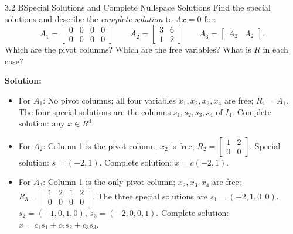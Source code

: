 \documentclass[11pt,a4paper,openany,oneside]{book}
\def\vect#1{#1}%
\def\mathbf#1{#1}%
\newcommand{\vect}[1]{\mathbf{#1}}
\numberwithin{equation}{chapter}
\begin{document}
\begin{example}{3.2 B}{Special Solutions and Complete Nullspace Solutions}
Find the special solutions and describe the \emph{complete solution} to $A\vect{x} = \vect{0}$ for:
\[
A_1 = \begin{bmatrix} 0 & 0 & 0 & 0 \\ 0 & 0 & 0 & 0 \end{bmatrix} \qquad A_2 = \begin{bmatrix} 3 & 6 \\ 1 & 2 \end{bmatrix} \qquad A_3 = \begin{bmatrix} A_2 & A_2 \end{bmatrix}.
\]
Which are the pivot columns? Which are the free variables? What is $R$ in each case?
\end{example}
\textbf{Solution:}
\begin{itemize}
\item For $A_1$: No pivot columns; all four variables $x_1, x_2, x_3, x_4$ are free; $R_1 = A_1$. The four special solutions are the columns $\vect{s}_1, \vect{s}_2, \vect{s}_3, \vect{s}_4$ of $I_4$. Complete solution: any $\vect{x} \in \mathbf{R}^4$.
\item For $A_2$: Column 1 is the pivot column; $x_2$ is free; $R_2 = \begin{bmatrix}1 & 2\\0 & 0\end{bmatrix}$. Special solution: $\vect{s} = (-2,1)$. Complete solution: $\vect{x} = c(-2,1)$.
\item For $A_3$: Column 1 is the only pivot column; $x_2, x_3, x_4$ are free; $R_3 = \begin{bmatrix}1 & 2 & 1 & 2\\0 & 0 & 0 & 0\end{bmatrix}$. The three special solutions are $\vect{s}_1 = (-2,1,0,0)$, $\vect{s}_2 = (-1,0,1,0)$, $\vect{s}_3 = (-2,0,0,1)$. Complete solution: $\vect{x} = c_1\vect{s}_1 + c_2\vect{s}_2 + c_3\vect{s}_3$.
\end{itemize}
\end{document}
